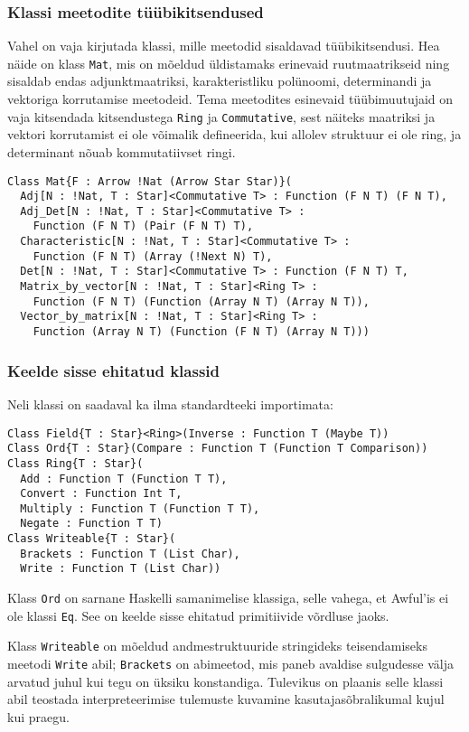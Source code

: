 \documentclass[12pt]{article}
\begin{document}
      \subsubsection{Klassi meetodite tüübikitsendused}
        Vahel on vaja kirjutada klassi, mille meetodid sisaldavad tüübikitsendusi. Hea näide on klass \verb!Mat!, mis on mõeldud üldistamaks erinevaid ruutmaatrikseid ning sisaldab endas adjunktmaatriksi, karakteristliku polünoomi, determinandi ja vektoriga korrutamise meetodeid. Tema meetodites esinevaid tüübimuutujaid on vaja kitsendada kitsendustega \verb!Ring! ja \verb!Commutative!, sest näiteks maatriksi ja vektori korrutamist ei ole võimalik defineerida, kui allolev struktuur ei ole ring, ja determinant nõuab kommutatiivset ringi.

        \begin{verbatim}Class Mat{F : Arrow !Nat (Arrow Star Star)}(
  Adj[N : !Nat, T : Star]<Commutative T> : Function (F N T) (F N T),
  Adj_Det[N : !Nat, T : Star]<Commutative T> :
    Function (F N T) (Pair (F N T) T),
  Characteristic[N : !Nat, T : Star]<Commutative T> :
    Function (F N T) (Array (!Next N) T),
  Det[N : !Nat, T : Star]<Commutative T> : Function (F N T) T,
  Matrix_by_vector[N : !Nat, T : Star]<Ring T> :
    Function (F N T) (Function (Array N T) (Array N T)),
  Vector_by_matrix[N : !Nat, T : Star]<Ring T> :
    Function (Array N T) (Function (F N T) (Array N T)))\end{verbatim}
      \subsubsection{Keelde sisse ehitatud klassid}\label{klassmaatriks}
        Neli klassi on saadaval ka ilma standardteeki importimata:

        \begin{verbatim}Class Field{T : Star}<Ring>(Inverse : Function T (Maybe T))
Class Ord{T : Star}(Compare : Function T (Function T Comparison))
Class Ring{T : Star}(
  Add : Function T (Function T T),
  Convert : Function Int T,
  Multiply : Function T (Function T T),
  Negate : Function T T)
Class Writeable{T : Star}(
  Brackets : Function T (List Char),
  Write : Function T (List Char))\end{verbatim}

        Klass \verb!Ord! on sarnane Haskelli samanimelise klassiga, selle vahega, et Awful'is ei ole klassi \verb!Eq!. See on keelde sisse ehitatud primitiivide võrdluse jaoks.

        Klass \verb!Writeable! on mõeldud andmestruktuuride stringideks teisendamiseks meetodi \verb!Write! abil; \verb!Brackets! on abimeetod, mis paneb avaldise sulgudesse välja arvatud juhul kui tegu on üksiku konstandiga. Tulevikus on plaanis selle klassi abil teostada interpreteerimise tulemuste kuvamine kasutajasõbralikumal kujul kui praegu.
\end{document}

